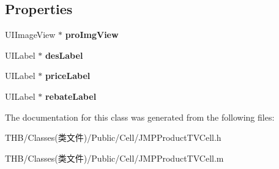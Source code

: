 \subsection*{Properties}
\begin{DoxyCompactItemize}
\item 
\mbox{\label{interface_j_m_p_product_t_v_cell_a6701b42e4444cea5cdd6a5d814a9be5c}} 
U\+I\+Image\+View $\ast$ {\bfseries pro\+Img\+View}
\item 
\mbox{\label{interface_j_m_p_product_t_v_cell_aa3aed67cd7c988b071e02b2e6a56fea2}} 
U\+I\+Label $\ast$ {\bfseries des\+Label}
\item 
\mbox{\label{interface_j_m_p_product_t_v_cell_a8dc37e9bc04e3c904a12d6ddc046ed7f}} 
U\+I\+Label $\ast$ {\bfseries price\+Label}
\item 
\mbox{\label{interface_j_m_p_product_t_v_cell_a3c0085bfd9b86daf14b180b3debf7ac9}} 
U\+I\+Label $\ast$ {\bfseries rebate\+Label}
\end{DoxyCompactItemize}


The documentation for this class was generated from the following files\+:\begin{DoxyCompactItemize}
\item 
T\+H\+B/\+Classes(类文件)/\+Public/\+Cell/J\+M\+P\+Product\+T\+V\+Cell.\+h\item 
T\+H\+B/\+Classes(类文件)/\+Public/\+Cell/J\+M\+P\+Product\+T\+V\+Cell.\+m\end{DoxyCompactItemize}
